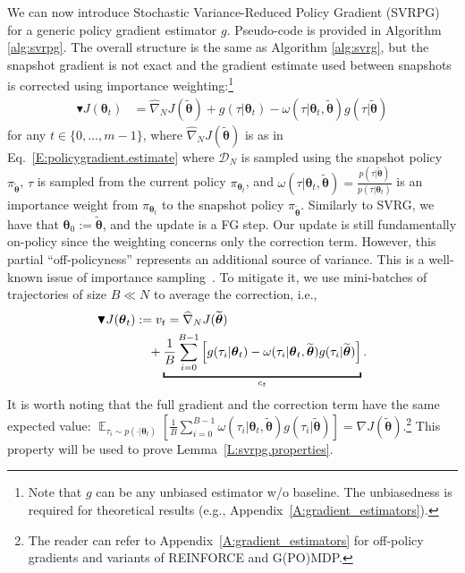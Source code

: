 \documentclass{article}
\makeatletter
\theoremstyle{remark}
\theoremstyle{definition}
\DeclareRobustCommand{\eg}{e.g.,\@\xspace}
\DeclareRobustCommand{\ie}{i.e.,\@\xspace}
\DeclareMathOperator*{\EV}{\mathbb{E}}
\newcommand{\EVV}[2][\ppvect \in \ppspace]{\EV_{#1}\left[{#2}\right]}
\newcommand{\vtheta}{\boldsymbol{\theta}}
\newcommand{\wt}[1]{\widetilde{#1}}
\newcommand{\wh}[1]{\widehat{#1}}
\makeatother
\begin{document}
We can now introduce Stochastic Variance-Reduced Policy Gradient (SVRPG) for a generic policy gradient estimator $g$. Pseudo-code is provided in Algorithm \ref{alg:svrpg}.
The overall structure is the same as Algorithm \ref{alg:svrg}, 
but the snapshot gradient is not exact and the gradient estimate used between snapshots is corrected using importance weighting:\footnote{\color{red} Note that $g$ can be any unbiased estimator w/o baseline. The unbiasedness is required for theoretical results (\eg Appendix~\ref{A:gradient_estimators}).}
\begin{align*}
        \blacktriangledown J(\vtheta_{t}) &= \wh{\nabla}_N J(\wt{\vtheta}) + g(\tau|\vtheta_t) - \omega(\tau|\vtheta_t, \wt{\vtheta}) g(\tau|\wt{\vtheta})
\end{align*}
for any $t \in \{0,\ldots,m-1\}$,
where $\wh{\nabla}_N J(\wt{\vtheta})$ is as in Eq.~\eqref{E:policygradient.estimate} where $\mathcal{D}_N$ is sampled using the snapshot policy $\pi_{\wt{\vtheta}}$, $\tau$ is sampled from the current policy $\pi_{\vtheta_t}$, and $\omega(\tau|\vtheta_t, \wt{\vtheta}) = \frac{p(\tau|\wt{\vtheta})}{p(\tau|\vtheta_t)}$ is an importance weight from $\pi_{\vtheta_t}$ to the snapshot policy $\pi_{\wt{\vtheta}}$. 
Similarly to SVRG, we have that $\vtheta_0 := \wt{\vtheta}$, and the update is a FG step.
Our update is still fundamentally on-policy since the weighting concerns only the correction term. However, this partial ``off-policyness'' represents an additional source of variance. This is a well-known issue of importance sampling~\citep[\eg][]{thomas2015high}. To mitigate it, we use mini-batches of trajectories of size $B \ll N$ to average the correction, \ie
\begin{align}\label{E:svrpg.estimate.batch}
        \blacktriangledown J(\vtheta_{t}) &:= v_t= \wh{\nabla}_N J(\wt{\vtheta})\\ \notag
                                            & \quad{} + 
        \underbracket{
        \frac{1}{B} \sum_{i=0}^{B-1} \left[
        g(\tau_i|\vtheta_t) - \omega(\tau_i|\vtheta_t, \wt{\vtheta}) g(\tau_i|\wt{\vtheta})
\right]}_{c_t}.
\end{align}
It is worth noting that the full gradient and the correction term have the same expected value: $\EVV[\tau_i \sim p(\cdot|\vtheta_t)]{\frac{1}{B} \sum_{i=0}^{B-1} \omega(\tau_i|\vtheta_t, \wt{\vtheta}) g(\tau_i|\wt{\vtheta})} = \nabla J(\wt{\vtheta})$.\footnote{The reader can refer to Appendix~\ref{A:gradient_estimators} for off-policy gradients and variants of REINFORCE and G(PO)MDP.}
This property will be used to prove Lemma~\ref{L:svrpg.properties}.
\end{document}
